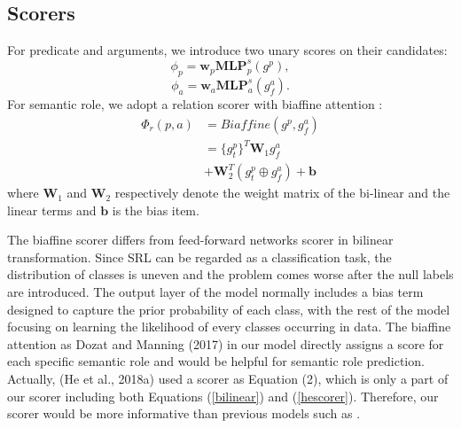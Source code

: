 \documentclass[letterpaper]{article} %
\begin{document}
\subsection{Scorers}%
For predicate and arguments, we introduce two unary scores on their candidates:
$$\phi_p = \textbf{w}_p \textbf{MLP}^s_p(g^p),$$
$$\phi_a = \textbf{w}_a \textbf{MLP}^s_a(g_f^a).$$
For semantic role,
we adopt a relation scorer with biaffine attention \cite{dozat2017deep}:
\begin{align}
\Phi_{r}(p, a) &= \textit{Biaffine}(g^p, g^a_f)\nonumber\\
	 &= \{g^p_t\}^T \textbf{W}_1 g^a_f \label{bilinear}\\
	&+ \textbf{W}_2^T (g^p_t \oplus g^a_f) + \textbf{b} \label{hescorer}
\end{align}
where $\textbf{W}_1$ and $\textbf{W}_2$ respectively denote the weight matrix of the bi-linear and the linear terms and $\textbf{b}$ is the bias item.

The biaffine scorer differs from feed-forward networks scorer in bilinear transformation. Since SRL can be regarded as a classification task, the distribution of classes is uneven and the problem comes worse after the null labels are introduced. The output layer of the model normally includes a bias term designed to capture the prior probability of each class, with the rest of the model focusing on learning the likelihood of every classes occurring in data. 
The biaffine attention as Dozat and Manning (2017) in our model directly assigns a score for each specific semantic role and would be helpful for semantic role prediction. Actually, (He et al., 2018a) used a scorer as Equation (2), which is only a part of our scorer including both Equations (\ref{bilinear}) and (\ref{hescorer}). Therefore, our scorer would be more informative than previous models such as \cite{he2018jointly}.
\end{document}
